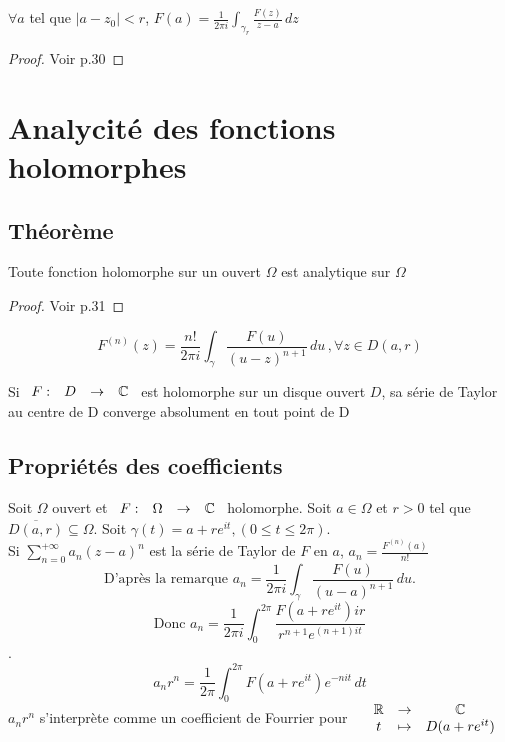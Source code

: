 \documentclass[]{report}
\begin{document}
\begin{tm}
    $\forall a$ tel que $|a-z_0|<r$, $\displaystyle{F(a)=\frac{1}{2\pi i}\int_{\gamma_r} \frac{F(z)}{z-a}\,dz}$
\end{tm}

\begin{proof}
    Voir p.30
\end{proof}

\section{Analycité des fonctions holomorphes}

\subsection{Théorème}

\begin{tm}
    Toute fonction holomorphe sur un ouvert $\Omega$ est analytique sur $\Omega$
\end{tm}

\begin{proof}
    Voir p.31
\end{proof}

\begin{re}
    $$F^{(n)}(z)=\frac{n!}{2 \pi i}\int_\gamma \frac{F(u)}{(u-z)^{n+1}}\,du\,,\forall z\in D(a,r)$$
\end{re}

\begin{tm}
    Si $\begin{array}{ccccc}
F : & D & \to & \mathbb{C}
\end{array}$ est holomorphe sur un disque ouvert $D$, sa série de Taylor au centre de D converge absolument en tout point de D
\end{tm}

\subsection{Propriétés des coefficients}

Soit $\Omega$ ouvert et $\begin{array}{ccccc}
F : & \Omega & \to & \mathbb{C}
\end{array}$ holomorphe. Soit $a\in \Omega$ et $r>0$ tel que $\overline{D(a,r)}\subseteq \Omega$. Soit $\gamma(t)=a+re^{it},(0\le t\le 2\pi)$.\\
Si $\displaystyle{\sum_{n=0}^{+\infty}a_n(z-a)^n}$ est la série de Taylor de $F$ en $a$, $a_n= \frac{F^{(n)}(a)}{n!}$
$$\text{D'après la remarque } \displaystyle{a_n=\frac{1}{2\pi i}\int_\gamma\frac{F(u)}{(u-a)^{n+1}}\,du}.$$
$$\text{Donc } \displaystyle{a_n=\frac{1}{2\pi i}\int_{0}^{2\pi}\frac{F(a+re^{it})ir}{r^{n+1}e^{(n+1)it}}}$$.
$$a_nr^n=\frac{1}{2\pi}\int_0^{2\pi}F(a+re^{it})e^{-nit}\,dt$$
$a_nr^n$ s'interprète comme un coefficient de Fourrier pour $\begin{array}{ccccc}
& \mathbb{R} & \to & \mathbb{C} \\
& t & \mapsto & D(a+re^{it})  
\end{array}$
\end{document}
